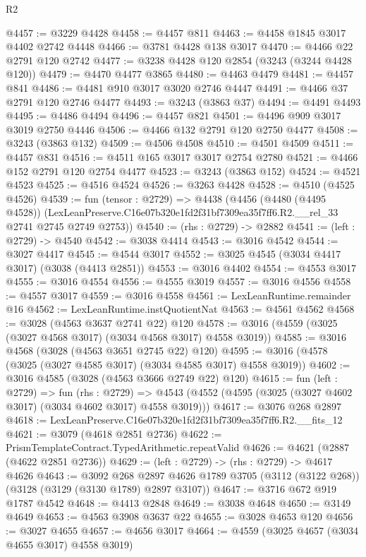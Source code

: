 \begin{lexlean}{R2}
\begin{coremodule}
@4457 := @3229 @4428
@4458 := @4457 @811
@4463 := @4458 @1845 @3017 @4402 @2742 @4448
@4466 := @3781 @4428 @138 @3017
@4470 := @4466 @22 @2791 @120 @2742
@4477 := @3238 @4428 @120 @2854 (@3243 (@3244 @4428 @120))
@4479 := @4470 @4477 @3865
@4480 := @4463 @4479
@4481 := @4457 @841
@4486 := @4481 @910 @3017 @3020 @2746 @4447
@4491 := @4466 @37 @2791 @120 @2746 @4477
@4493 := @3243 (@3863 @37)
@4494 := @4491 @4493
@4495 := @4486 @4494
@4496 := @4457 @821
@4501 := @4496 @909 @3017 @3019 @2750 @4446
@4506 := @4466 @132 @2791 @120 @2750 @4477
@4508 := @3243 (@3863 @132)
@4509 := @4506 @4508
@4510 := @4501 @4509
@4511 := @4457 @831
@4516 := @4511 @165 @3017 @3017 @2754 @2780
@4521 := @4466 @152 @2791 @120 @2754 @4477
@4523 := @3243 (@3863 @152)
@4524 := @4521 @4523
@4525 := @4516 @4524
@4526 := @3263 @4428
@4528 := @4510 (@4525 @4526)
@4539 := fun (tensor : @2729) =>
  @4438
    (@4456
      (@4480 (@4495 @4528))
      (LexLeanPreserve.C16e07b320e1fd2f31bf7309ea35f7ff6.R2.__rel_33 @2741 @2745 @2749 @2753))
@4540 := (rhs : @2729) -> @2882
@4541 := (left : @2729) -> @4540
@4542 := @3038 @4414
@4543 := @3016 @4542
@4544 := @3027 @4417
@4545 := @4544 @3017
@4552 := @3025 @4545 (@3034 @4417 @3017) (@3038 (@4413 @2851))
@4553 := @3016 @4402
@4554 := @4553 @3017
@4555 := @3016 @4554
@4556 := @4555 @3019
@4557 := @3016 @4556
@4558 := @4557 @3017
@4559 := @3016 @4558
@4561 := LexLeanRuntime.remainder @16
@4562 := LexLeanRuntime.instQuotientNat
@4563 := @4561 @4562
@4568 := @3028 (@4563 @3637 @2741 @22) @120
@4578 := @3016 (@4559 (@3025 (@3027 @4568 @3017) (@3034 @4568 @3017) @4558 @3019))
@4585 := @3016 @4568 (@3028 (@4563 @3651 @2745 @22) @120)
@4595 := @3016 (@4578 (@3025 (@3027 @4585 @3017) (@3034 @4585 @3017) @4558 @3019))
@4602 := @3016 @4585 (@3028 (@4563 @3666 @2749 @22) @120)
@4615 := fun (left : @2729) =>
  fun (rhs : @2729) =>
  @4543 (@4552 (@4595 (@3025 (@3027 @4602 @3017) (@3034 @4602 @3017) @4558 @3019)))
@4617 := @3076 @268 @2897
@4618 := LexLeanPreserve.C16e07b320e1fd2f31bf7309ea35f7ff6.R2.__fits_12
@4621 := @3079 (@4618 @2851 @2736)
@4622 := PrismTemplateContract.TypedArithmetic.repeatValid
@4626 := @4621 (@2887 (@4622 @2851 @2736))
@4629 := (left : @2729) -> (rhs : @2729) -> @4617 @4626
@4643 := @3092
    @268
    @2897
    @4626
    @1789
    @3705
    (@3112 (@3122 @268))
    (@3128 (@3129 (@3130 @1789) @2897 @3107))
@4647 := @3716 @672 @919 @1787 @4542
@4648 := @4413 @2848
@4649 := @3038 @4648
@4650 := @3149 @4649
@4653 := @4563 @3908 @3637 @22
@4655 := @3028 @4653 @120
@4656 := @3027 @4655
@4657 := @4656 @3017
@4664 := @4559 (@3025 @4657 (@3034 @4655 @3017) @4558 @3019)

\end{coremodule}
\end{lexlean}
